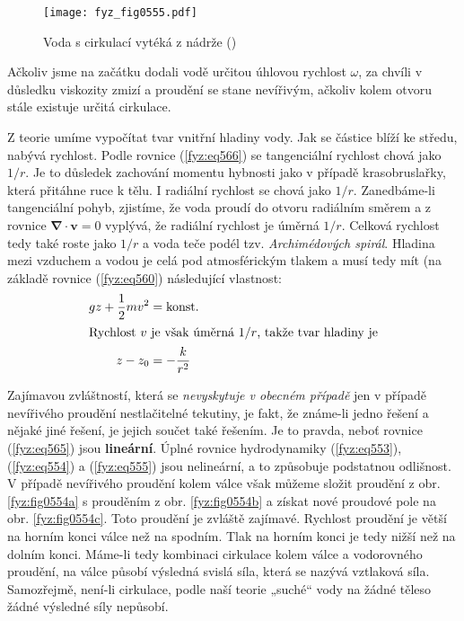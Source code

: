     \begin{figure}[ht!] %
      \centering
      \texttt{[image: fyz\_fig0555.pdf]}
      \caption{Voda s cirkulací vytéká z nádrže
               (\cite[s.~752]{Feynman02})}
      \label{fyz:fig0555}
    \end{figure}
    
    Ačkoliv jsme na začátku dodali vodě určitou úhlovou rychlost \(\omega\), za chvíli v důsledku 
    viskozity zmizí a proudění se stane nevířivým, ačkoliv kolem otvoru stále existuje určitá 
    cirkulace.
    
    Z teorie umíme vypočítat tvar vnitřní hladiny vody. Jak se částice blíží ke středu, nabývá 
    rychlost. Podle rovnice (\ref{fyz:eq566}) se tangenciální rychlost chová jako \(1/r\). Je to 
    důsledek zachování momentu hybnosti jako v případě krasobruslařky, která přitáhne ruce k tělu. 
    I radiální rychlost se chová jako \(1/r\). Zanedbáme-li tangenciální pohyb, zjistíme, že voda 
    proudí do otvoru radiálním směrem a z rovnice \(\symbf{\nabla}\cdot\bm{v} = 0\) vyplývá, že 
    radiální rychlost je úměrná \(1/r\). Celková rychlost tedy také roste jako \(1/r\) a voda teče 
    podél tzv. \emph{Archimédových spirál}. Hladina mezi vzduchem a vodou je celá pod atmosférickým 
    tlakem a musí tedy mít (na základě rovnice (\ref{fyz:eq560}) následující vlastnost:
    \begin{align*}
      gz + \dfrac{1}{2}mv^2 &= \text{konst}.                                           \\
      \shortintertext{Rychlost \(v\) je však úměrná \(1/r\), takže tvar hladiny je}
      z - z_0               &= - \dfrac{k}{r^2}
    \end{align*}
    
    Zajímavou zvláštností, která se \emph{nevyskytuje v obecném případě} jen v případě nevířivého 
    proudění nestlačitelné tekutiny, je fakt, že známe-li jedno řešení a nějaké jiné řešení, je 
    jejich součet také řešením. Je to pravda, neboť rovnice (\ref{fyz:eq565}) jsou 
    \textbf{lineární}. Úplné rovnice hydrodynamiky (\ref{fyz:eq553}), (\ref{fyz:eq554}) a 
    (\ref{fyz:eq555}) jsou nelineární, a to způsobuje podstatnou odlišnost. V případě nevířivého 
    proudění kolem válce však můžeme složit proudění z obr. \ref{fyz:fig0554a} s prouděním z obr. 
    \ref{fyz:fig0554b} a získat nové proudové pole na obr. \ref{fyz:fig0554c}. Toto proudění je 
    zvláště zajímavé. Rychlost proudění je větší na horním konci válce než na spodním. Tlak na 
    horním konci je tedy nižší než na dolním konci. Máme-li tedy kombinaci cirkulace kolem válce a 
    vodorovného proudění, na válce působí výsledná svislá síla, která se nazývá vztlaková síla. 
    Samozřejmě, není-li cirkulace, podle naší teorie „suché“ vody na žádné těleso žádné výsledné 
    síly nepůsobí.
    
